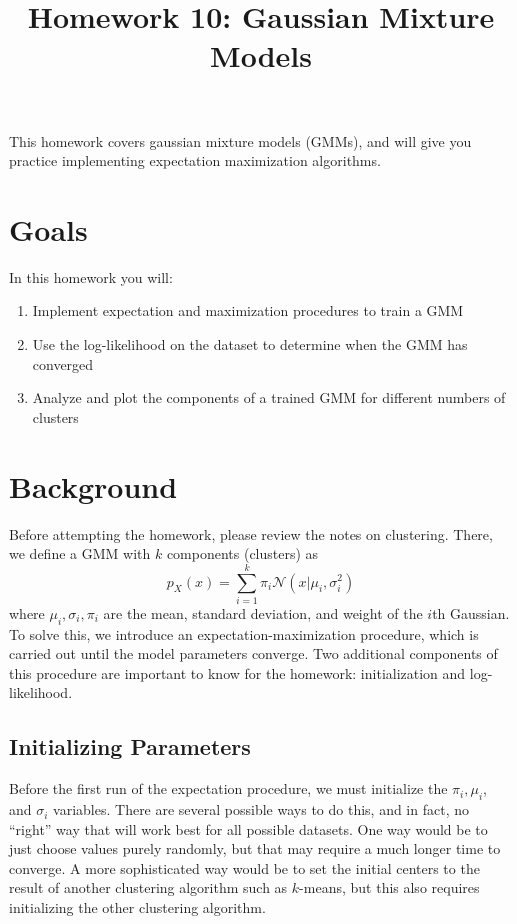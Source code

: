 \documentclass[10pt]{article}
\begin{document}
\title{\textbf{Homework 10: Gaussian Mixture Models}}
\date{ }
\maketitle

This homework covers gaussian mixture models (GMMs), and will give you practice implementing expectation maximization algorithms.

\section{Goals}
In this homework you will:
\begin{enumerate}
\item Implement expectation and maximization procedures to train a GMM
\item Use the log-likelihood on the dataset to determine when the GMM has converged
\item Analyze and plot the components of a trained GMM for different numbers of clusters
\end{enumerate}

\section{Background}
Before attempting the homework, please review the notes on clustering. There, we define a GMM with $k$ components (clusters) as
$$p_X(x) = \sum_{i=1}^{k} \pi_i \mathcal{N} (x | \mu_i, \sigma_i^2)$$
where $\mu_i, \sigma_i, \pi_i$ are the mean, standard deviation, and weight of the $i$th Gaussian. To solve this, we introduce an expectation-maximization procedure, which is carried out until the model parameters converge. Two additional components of this procedure are important to know for the homework: initialization and log-likelihood.

\subsection{Initializing Parameters}
Before the first run of the expectation procedure, we must initialize the $\pi_i, \mu_i$, and $\sigma_i$ variables. There are several possible ways to do this, and in fact, no ``right'' way that will work best for all possible datasets. One way would be to just choose values purely randomly, but that may require a much longer time to converge. A more sophisticated way would be to set the initial centers to the result of another clustering algorithm such as $k$-means, but this also requires initializing the other clustering algorithm.
\end{document}
